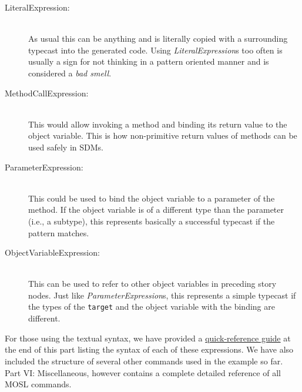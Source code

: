 \begin{description}
  
  \item[LiteralExpression:]~\\ 
  As usual this can be anything and is literally copied with a surrounding typecast 
  into the generated code.  Using \emph{LiteralExpression}s too often is usually a sign 
  for not thinking in a pattern oriented manner and is considered a \emph{bad smell}.
  
  \vspace{0.5cm}
  
  \item[MethodCallExpression:]~\\ 
  This would allow invoking a method and binding its return value to the object variable.  
  This is how non-primitive return values of methods can be used safely in SDMs.
  
  \vspace{0.5cm}
  
  \item[ParameterExpression:]~\\ 
  This could be used to bind the object variable to a parameter of the method.  
  If the object variable is of a different type than the parameter (i.e., a subtype), 
  this represents basically a successful typecast if the pattern matches.
  
  \newpage
  
  \item[ObjectVariableExpression:]~\\ 
  This can be used to refer to other object variables in preceding story nodes.  
  Just like \emph{ParameterExpression}s, this represents a simple typecast if the 
  types of the \texttt{target} and the object variable with the binding are different.

\end{description}

For those using the textual syntax, we have provided a \hyperlink{quickRef}{quick-reference guide} at the end of this part listing the syntax of each of these
expressions. We have also included the structure of several other commands used in the example so far. Part VI: Miscellaneous, however contains a complete
detailed reference of all MOSL commands.
